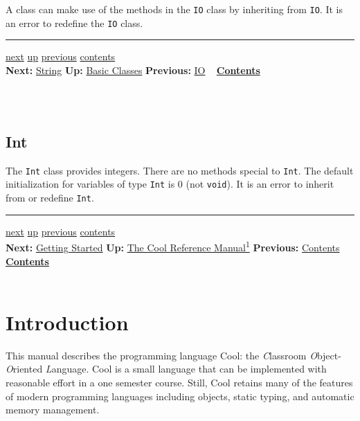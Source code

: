 \documentclass[]{article}
\begin{document}
A class can make use of the methods in the \texttt{IO} class by
inheriting from \texttt{IO}. It is an error to redefine the \texttt{IO}
class.

\begin{center}\rule{3in}{0.4pt}\end{center}

\href{node30.html}{next} \href{node26.html}{up}
\href{node28.html}{previous} \href{node1.html}{contents} \\
\textbf{Next:} \href{node30.html}{String} \textbf{Up:}
\href{node26.html}{Basic Classes} \textbf{Previous:}
\href{node28.html}{IO} ~ \textbf{\href{node1.html}{Contents}} \\ \\

\subsection{\\ Int}

The \texttt{Int} class provides integers. There are no methods special
to \texttt{Int}. The default initialization for variables of type
\texttt{Int} is 0 (not \texttt{void}). It is an error to inherit from or
redefine \texttt{Int}.

\begin{center}\rule{3in}{0.4pt}\end{center}

\href{node3.html}{next} \href{cool-manual.html}{up}
\href{node1.html}{previous} \href{node1.html}{contents} \\
\textbf{Next:} \href{node3.html}{Getting Started} \textbf{Up:}
\href{cool-manual.html}{The Cool Reference Manual\textsuperscript{1}}
\textbf{Previous:} \href{node1.html}{Contents} ~
\textbf{\href{node1.html}{Contents}} \\ \\

\section{Introduction}

This manual describes the programming language Cool: the
\emph{C}lassroom \emph{O}bject-\emph{O}riented \emph{L}anguage. Cool is
a small language that can be implemented with reasonable effort in a one
semester course. Still, Cool retains many of the features of modern
programming languages including objects, static typing, and automatic
memory management.
\end{document}
